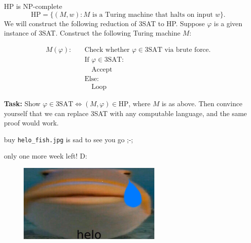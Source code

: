 \documentclass{beamer}
\begin{document}
\begin{frame}{HP is NP-complete}
$$\text{HP} = \{(M, w): \text{$M$ is a Turing machine that halts on input $w$}\}.$$
We will construct the following reduction of 3SAT to HP. Suppose $\varphi$ is a given instance of 3SAT. Construct the following Turing machine $M$:

\begin{align*}
M(\varphi): \quad &\text{Check whether $\varphi \in \text{3SAT}$ via brute force.}\\
&\text{If $\varphi \in \text{3SAT}$:}\\
&\quad \text{Accept}\\
&\text{Else:}\\
&\quad \text{Loop}
\end{align*}

\textbf{Task:} Show $\varphi \in \text{3SAT} \Leftrightarrow (M, \varphi) \in \text{HP}$, where $M$ is as above. Then convince yourself that we can replace 3SAT with any computable language, and the same proof would work.

\end{frame}




\begin{frame}{buy}
\texttt{helo\_fish.jpg} is sad to see you go ;-; 

only one more week left! D:

\begin{figure}[h]
\centering
\includegraphics[width=7cm]{img/helo_fish_sad.jpg}
\end{figure}
\end{frame}
\end{document}
